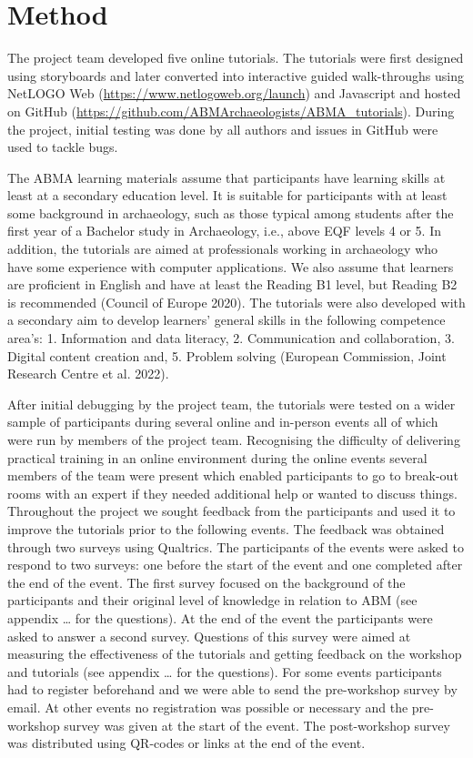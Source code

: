 \documentclass[
]{article}
\begin{document}
\hypertarget{method}{%
\section{Method}\label{method}}

The project team developed five online tutorials. The tutorials were first designed using storyboards and later converted into interactive guided walk-throughs using NetLOGO Web (\url{https://www.netlogoweb.org/launch}) and Javascript and hosted on GitHub (\url{https://github.com/ABMArchaeologists/ABMA_tutorials}). During the project, initial testing was done by all authors and issues in GitHub were used to tackle bugs.

The ABMA learning materials assume that participants have learning skills at least at a secondary education level. It is suitable for participants with at least some background in archaeology, such as those typical among students after the first year of a Bachelor study in Archaeology, i.e., above EQF levels 4 or 5. In addition, the tutorials are aimed at professionals working in archaeology who have some experience with computer applications. We also assume that learners are proficient in English and have at least the Reading B1 level, but Reading B2 is recommended (Council of Europe 2020). The tutorials were also developed with a secondary aim to develop learners' general skills in the following competence area's: 1. Information and data literacy, 2. Communication and collaboration, 3. Digital content creation and, 5. Problem solving (European Commission, Joint Research Centre et al. 2022).

After initial debugging by the project team, the tutorials were tested on a wider sample of participants during several online and in-person events all of which were run by members of the project team. Recognising the difficulty of delivering practical training in an online environment during the online events several members of the team were present which enabled participants to go to break-out rooms with an expert if they needed additional help or wanted to discuss things. Throughout the project we sought feedback from the participants and used it to improve the tutorials prior to the following events. The feedback was obtained through two surveys using Qualtrics. The participants of the events were asked to respond to two surveys: one before the start of the event and one completed after the end of the event. The first survey focused on the background of the participants and their original level of knowledge in relation to ABM (see appendix \ldots{} for the questions). At the end of the event the participants were asked to answer a second survey. Questions of this survey were aimed at measuring the effectiveness of the tutorials and getting feedback on the workshop and tutorials (see appendix \ldots{} for the questions). For some events participants had to register beforehand and we were able to send the pre-workshop survey by email. At other events no registration was possible or necessary and the pre-workshop survey was given at the start of the event. The post-workshop survey was distributed using QR-codes or links at the end of the event.
\end{document}
